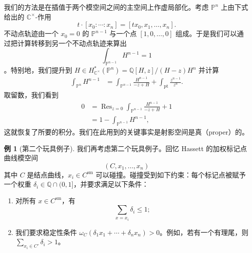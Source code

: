 \documentclass{amsart}
\theoremstyle{definition}
\newtheorem{exm}[thm]{例}
\theoremstyle{remark}
\theoremstyle{plain}
\theoremstyle{definition}
\theoremstyle{remark}
\newcommand{\C}{\mathbb{C}}
\newcommand{\Q}{\mathbb{Q}}
\renewcommand{\P}{\mathbb{P}}
\newcommand{\mr}[1]{\mathrm{#1}}
\newcommand{\on}[1]{\operatorname{#1}}
\newcommand{\1}{\mathbf{1}}
\newcommand{\2}{\mathbf{2}}
\newcommand{\3}{\mathbf{3}}
\begin{document}
我们的方法是在插值于两个模空间之间的主空间上作虚局部化。考虑 \(\P^n\) 上由下式给出的 \(\C^{\times}\)-作用
\[ t \cdot [x_0 : \cdots : x_n] = [t x_0, x_1, \ldots, x_n]. \]
不动点轨迹由一个 \(x_0 = 0\) 的 \(\P^{n-1}\) 与一个点 \([1, 0, \ldots, 0]\) 组成。于是我们可以通过把计算转移到另一个不动点轨迹来算出
\[ \int_{\P^{n-1}} H^{n-1} = 1 \]
。特别地，我们提升到 \(H \in H_{\C^{\times}}^* (\P^n) = \Q[H,z] / (H-z)H^n\) 并计算
\begin{align*}
    \int_{\P^n} H^{n-1} &= \int_{\P^{n-1}} \frac{H^{n-1}}{-z+H} + \int_{\mr{pt}} \frac{z^{n-1}}{z^n}.
\end{align*}
取留数，我们看到
\begin{align*}
    0 &= \on{Res}_{z = 0}\int_{\P^{n-1}} \frac{H^{n-1}}{-z+H} + 1 \\
    &= 1 - \int_{\P^{n-1}}H^{n-1},
\end{align*}
这就恢复了所要的积分。我们在此用到的关键事实是射影空间是真（proper）的。

\begin{exm}[第二个玩具例子]
    我们再考虑第二个玩具例子。回忆 Hassett 的加权标记点曲线模空间
    \[ (C, x_1, \ldots, x_n) \]
    其中 \(C\) 是结点曲线，\(x_i \in C^{\mr{sm}}\) 可以碰撞。碰撞受到如下约束：每个标记点被赋予一个权重 \(\delta_i \in \Q \cap (0,1]\)，并要求满足以下条件：
    \begin{enumerate}
        \item 对所有 \(x \in C^{\mr{sm}}\)，有
            \[ \sum_{x = x_i} \delta_i \leq 1; \]
        \item 我们要求稳定性条件 \(\omega_C(\delta_1 x_1 + \cdots + \delta_n x_n) > 0\)。例如，若有一个有理尾，则 \(\sum_{x_i \in C'} \delta_i > 1\)。
    \end{enumerate}
\end{exm}
\end{document}
